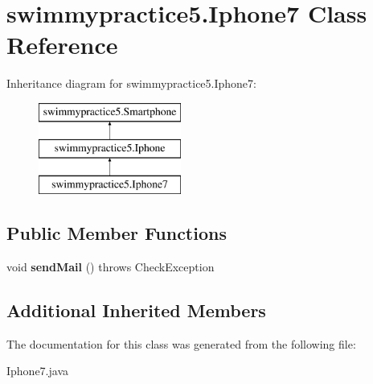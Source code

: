 \hypertarget{classswimmypractice5_1_1_iphone7}{}\section{swimmypractice5.\+Iphone7 Class Reference}
\label{classswimmypractice5_1_1_iphone7}
Inheritance diagram for swimmypractice5.\+Iphone7\+:\begin{figure}[H]
\begin{center}
\leavevmode
\includegraphics[height=3.000000cm]{classswimmypractice5_1_1_iphone7}
\end{center}
\end{figure}
\subsection*{Public Member Functions}
\begin{DoxyCompactItemize}
\item 
\mbox{\label{classswimmypractice5_1_1_iphone7_a845c8fba41e6428531e313c34d34a546}} 
void {\bfseries send\+Mail} ()  throws Check\+Exception
\end{DoxyCompactItemize}
\subsection*{Additional Inherited Members}


The documentation for this class was generated from the following file\+:\begin{DoxyCompactItemize}
\item 
Iphone7.\+java\end{DoxyCompactItemize}
